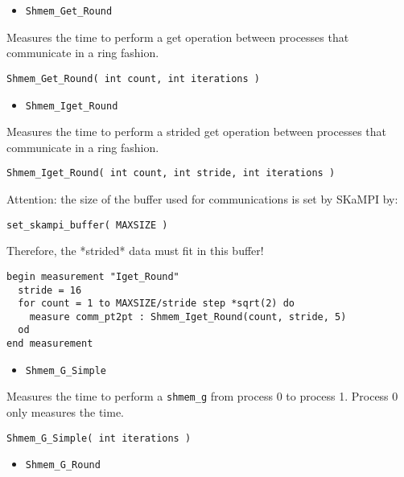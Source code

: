 \documentclass[12pt, letterpaper]{article}
\begin{document}
\begin{itemize}
    \item {\tt Shmem\_Get\_Round}
\end{itemize}

Measures the time to perform a get operation between processes that communicate in a ring fashion. 

\begin{lstlisting}
Shmem_Get_Round( int count, int iterations )
\end{lstlisting}

\begin{itemize}
    \item {\tt Shmem\_Iget\_Round}
\end{itemize}

Measures the time to perform a strided get operation between processes that communicate in a ring fashion. 

\begin{lstlisting}
Shmem_Iget_Round( int count, int stride, int iterations )
\end{lstlisting}

Attention: the size of the buffer used for communications is set by SKaMPI by:
\begin{lstlisting}
set_skampi_buffer( MAXSIZE )
\end{lstlisting}

Therefore, the *strided* data must fit in this buffer!
\begin{lstlisting}
begin measurement "Iget_Round"
  stride = 16	  
  for count = 1 to MAXSIZE/stride step *sqrt(2) do
    measure comm_pt2pt : Shmem_Iget_Round(count, stride, 5)
  od
end measurement
\end{lstlisting}

\begin{itemize}
    \item {\tt Shmem\_G\_Simple}
\end{itemize}

Measures the time to perform a {\tt shmem\_g} from process 0 to process 1. Process 0 only measures the time. 

\begin{lstlisting}
Shmem_G_Simple( int iterations ) 
\end{lstlisting}

\begin{itemize}
    \item {\tt Shmem\_G\_Round}
\end{itemize}
\end{document}
